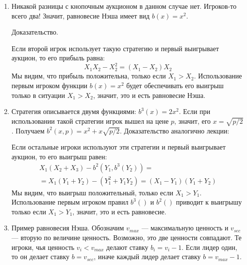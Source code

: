 \begin{enumerate}
\item  Никакой разницы с кнопочным аукционом в данном случае нет. Игроков-то всего два! Значит, равновесие Нэша имеет вид $ b(x)=x^{2} $.

Доказательство.

Если второй игрок использует такую стратегию и первый выигрывает аукцион, то его прибыль равна:
\begin{equation}
X_{1}X_{2}-X_{2}^{2}=(X_{1}-X_{2})X_{2}
\end{equation}
Мы видим, что прибыль положительна, только если $ X_{1}>X_{2} $. Использование первым игроком функции $ b(x)=x^{2} $ будет обеспечивать его выигрыш только в ситуации $ X_{1}>X_{2} $, значит, это и есть равновесие Нэша.


\item Стратегия описывается двумя функциями: $ b^{3}(x)=2x^{2} $. Если при использовании такой стратегии игрок вышел на цене $ p $, значит, его $ x=\sqrt{p/2} $. Получаем $ b^{2}(x,p)=x^{2}+x\sqrt{p/2}$. Доказательство аналогично лекции:

Если остальные игроки используют эти стратегии и первый выигрывает аукцион, то его выигрыш равен:
\begin{multline}
X_{1}(X_{2}+X_{3})-b^{2}(Y_{1},b^{3}(Y_{2}))=\\
=X_{1}(Y_{1}+Y_{2})-(Y_{1}^{2}+Y_{1}Y_{2})=(X_{1}-Y_{1})(Y_{1}+Y_{2})
\end{multline}
Мы видим, что выигрыш положительный, только если $ X_{1}>Y_{1} $. Использование первым игроком правил $ b^{3}() $ и $ b^{2}() $ приводит к выигрышу только если $ X_{1}>Y_{1} $, значит, это и есть равновесие.


\item  Пример равновесия Нэша. Обозначим $ v_{max} $ — максимальную ценность и $ v_{sec} $ — вторую по величине ценность. Возможно, это две ценности совпадают. Те игроки, чья ценность $ v_{i}<v_{max} $ делают ставку $ b_{i}=v_{i}-1 $. Если лидер один, то он делает ставку $ b=v_{sec} $, иначе каждый лидер делает ставку $ b=v_{max}-1 $.


\end{enumerate}
